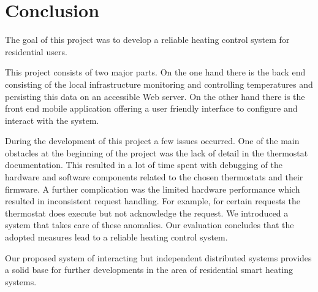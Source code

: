 
\chapter{Conclusion}
\label{sec:conclusion}


The goal of this project was to develop a reliable heating control system for residential users.

This project consists of two major parts.
On the one hand there is the back end consisting of the local infrastructure monitoring and controlling temperatures and persisting this data on an accessible Web server.
On the other hand there is the front end mobile application offering a user friendly interface to configure and interact with the system.

During the development of this project a few issues occurred.
One of the main obstacles at the beginning of the project was the lack of detail in the thermostat documentation.
This resulted in a lot of time spent with debugging of the hardware and software components related to the chosen thermostats and their firmware.
A further complication was the limited hardware performance which resulted in inconsistent request handling.
For example, for certain requests the thermostat does execute but not acknowledge the request.
We introduced a system that takes care of these anomalies.
Our evaluation concludes that the adopted measures lead to a reliable heating control system.


Our proposed system of interacting but independent distributed systems provides a solid base for further developments in the area of residential smart heating systems.
